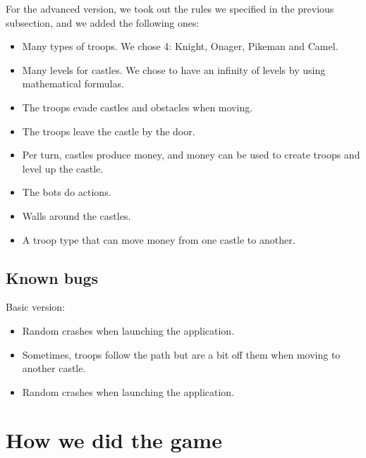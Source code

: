 \documentclass[12pt, a4paper]{report}
\begin{document}
For the advanced version, we took out the rules we specified in the previous subsection, and we added the following ones:

\begin{itemize}
    \item Many types of troops. We chose 4: Knight, Onager, Pikeman and Camel.
    \item Many levels for castles. We chose to have an infinity of levels by using mathematical formulas.
    \item The troops evade castles and obstacles when moving.
    \item The troops leave the castle by the door.
    \item Per turn, castles produce money, and money can be used to create troops and level up the castle.
    \item The bots do actions.
\end{itemize}


\begin{itemize}
    \item Walls around the castles.
    \item A troop type that can move money from one castle to another.
\end{itemize}

\subsection*{Known bugs}

Basic version:

\begin{itemize}
    \item Random crashes when launching the application.
    \item Sometimes, troops follow the path but are a bit off them when moving to another castle.
\end{itemize}


\begin{itemize}
    \item Random crashes when launching the application.
\end{itemize}

\section*{How we did the game}
\end{document}
